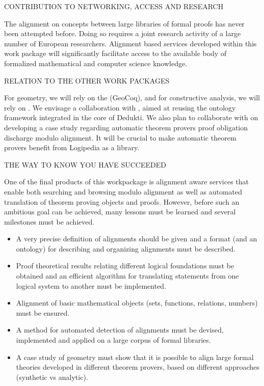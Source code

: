 {\color{red} CONTRIBUTION TO NETWORKING, ACCESS AND RESEARCH}

The alignment on concepts between large libraries of formal proofs has
never been attempted before.  Doing so requires a joint research
activity of a large number of European researchers.  Alignment based
services developed within this work package will significantly
facilitate access to the available body of formalized mathematical and
computer science knowledge.

{\color{red} RELATION TO THE OTHER WORK PACKAGES}

For geometry, we will rely on the 
(GeoCoq), and for constructive analysis, we will rely on
. We envisage a collaboration with
, aimed at reusing the ontology framework
integrated in the core of Dedukti. We also plan to collaborate with
 on developing a case study regarding automatic theorem provers proof
obligation discharge modulo alignment. It will be crucial to make
automatic theorem provers benefit from Logipedia as a library.

{\color{red} THE WAY TO KNOW YOU HAVE SUCCEEDED }

One of the final products of this workpackage is alignment aware services
that enable both searching and browsing modulo alignment as well as
automated translation of theorem proving objects and proofs.  However,
before such an ambitious goal can be achieved, many lessons must be
learned and several milestones must be achieved.
\begin{itemize}
\item A very precise definition of alignments should be given and a
  format (and an ontology) for describing and organizing alignments
  must be described.
\item Proof theoretical results relating different logical foundations
  must be obtained and an efficient algorithm for translating
  statements from one logical system to another must be implemented.
\item Alignment of basic mathematical objects (sets, functions,
  relations, numbers) must be ensured.
\item A method for automated detection of alignments must be devised,
  implemented and applied on a large corpus of formal libraries.
\item A case study of geometry must show that it is possible to align
  large formal theories developed in different theorem provers, based
  on different approaches (synthetic vs analytic).
\end{itemize}



